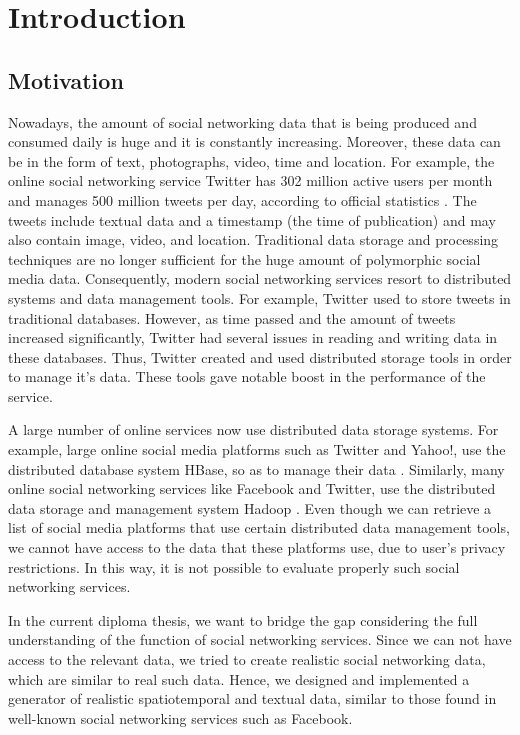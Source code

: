 \setcounter{chapter}{0}

\chapter{Introduction}

\setcounter{chapter}{1}

\section{Motivation}

Nowadays, the amount of social networking data that is being produced and consumed daily is huge and it is constantly increasing.
Moreover, these data can be in the form of text, photographs, video, time and location. For example, the online social networking service Twitter 
has 302 million active users per month and manages 500 million tweets per day, according to official statistics \cite {1}. 
The tweets include textual data and a timestamp (the time of publication) and may also contain
image, video, and location. Traditional data storage and processing techniques are no longer sufficient for the huge amount of polymorphic 
social media data. Consequently, modern social networking services
resort to distributed systems and data management tools. For example, Twitter \cite {2} used to 
store tweets in traditional databases. However, as time passed and the amount of tweets increased significantly, Twitter had several issues in 
reading and writing data in these databases. Thus, Twitter created and used distributed storage tools in order to manage it's data. 
These tools gave notable boost in the performance of the service.

A large number of online services now use distributed data storage systems. For example, large online social media platforms 
such as Twitter and Yahoo!, use the distributed database system HBase, so as to manage their data \cite {4}. 
Similarly, many online social networking services like Facebook and Twitter,
use the distributed data storage and management system Hadoop \cite {6}. 
Even though we can retrieve a list of social media platforms that use certain distributed data management tools, 
we cannot have access to the data that these platforms use, due to user's privacy restrictions. 
In this way, it is not possible to 
evaluate properly such social networking services.

In the current diploma thesis, we want to bridge the gap considering the full understanding of the function of social networking services.
Since we can not have access to the relevant data, we tried to create realistic social networking data, which are similar to real such data.
Hence, we designed and implemented a generator of realistic spatiotemporal and textual data, similar to 
those found in well-known social networking services such as Facebook.

